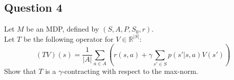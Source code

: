 \documentclass[11pt]{article}
\begin{document}
\subsection{Question 4}
Let $M$ be an MDP, defined by $(S,A,P,S_0,r)$.\\
Let $T$ be the following operator for $V\in\mathbb{R}^{|S|}$:
\[
\left( {{TV}} \right)\left( s \right) =\frac{1}{|A|}\sum_{a\in A} \left( {r\left( {s,a} \right) + \gamma {\sum _{s' \in S}}p\left( {s'|s,a} \right)V\left( {s'} \right)} \right)
\]
Show that $T$ is a $\gamma$-contracting with respect to the max-norm.








\end{document}
